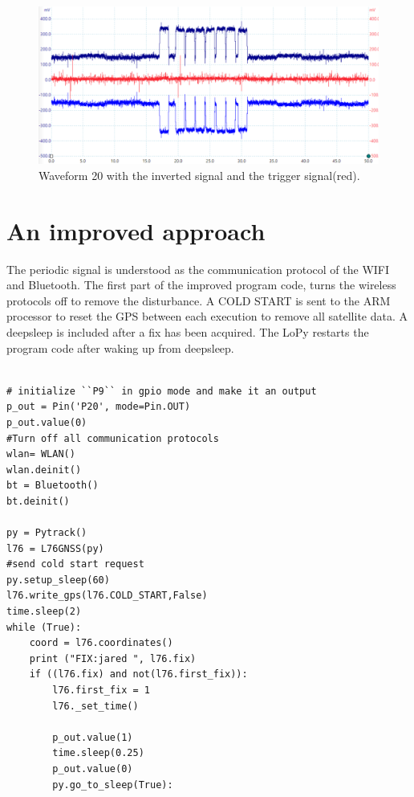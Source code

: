 \begin{figure}[H]
\centering
\includegraphics[width=16 cm]{Project_Report/Images/waveform20.PNG}
\caption{Waveform 20 with the inverted signal and the trigger signal(red).}
\label{fig:waveform20}
\end{figure}


\section{An improved approach}

The periodic signal is understood as the communication protocol of the WIFI and Bluetooth. The first part of the improved program code, turns the wireless protocols off to remove the disturbance. A COLD START is sent to the ARM processor to reset the GPS between each execution to remove all satellite data. A deepsleep is included after a fix has been acquired. The LoPy restarts the program code after waking up from deepsleep. 

\lstset{language=Python}          %
\begin{lstlisting}[frame=single]  % Start your code-block

# initialize ``P9`` in gpio mode and make it an output
p_out = Pin('P20', mode=Pin.OUT)
p_out.value(0)
#Turn off all communication protocols
wlan= WLAN()
wlan.deinit()
bt = Bluetooth()
bt.deinit()

py = Pytrack()
l76 = L76GNSS(py)
#send cold start request
py.setup_sleep(60)
l76.write_gps(l76.COLD_START,False)
time.sleep(2)
while (True):
    coord = l76.coordinates()
    print ("FIX:jared ", l76.fix)
    if ((l76.fix) and not(l76.first_fix)):
        l76.first_fix = 1
        l76._set_time()

        p_out.value(1)
        time.sleep(0.25)
        p_out.value(0)
        py.go_to_sleep(True):

\end{lstlisting}
\label{code:intial}






